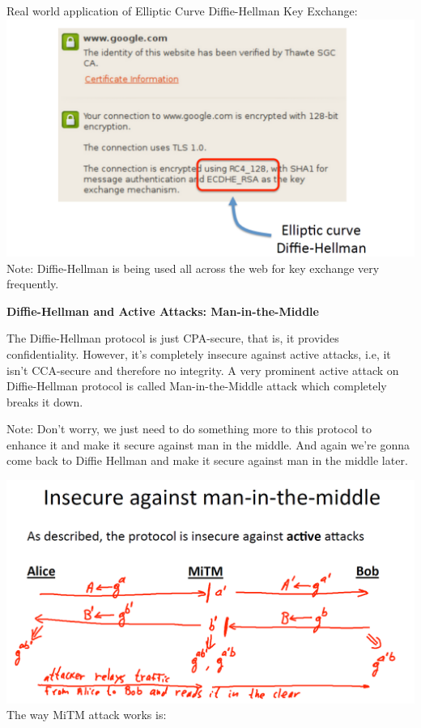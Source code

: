 \documentclass[11pt]{article}
\makeatletter
\def\maxwidth{\ifdim\Gin@nat@width>\linewidth\linewidth
    \else\Gin@nat@width\fi}
\let\Oldincludegraphics\includegraphics
\renewcommand{\includegraphics}[1]{\Oldincludegraphics[width=.8\maxwidth]{#1}}
\makeatother
\begin{document}
Real world application of Elliptic Curve Diffie-Hellman Key Exchange:
\includegraphics{./Images/DH-Application.png} Note: Diffie-Hellman is
being used all across the web for key exchange very frequently.

\textbf{Diffie-Hellman and Active Attacks: Man-in-the-Middle}

The Diffie-Hellman protocol is just CPA-secure, that is, it provides
confidentiality. However, it's completely insecure against active
attacks, i.e, it isn't CCA-secure and therefore no integrity. A very
prominent active attack on Diffie-Hellman protocol is called
Man-in-the-Middle attack which completely breaks it down.

Note: Don't worry, we just need to do something more to this protocol to
enhance it and make it secure against man in the middle. And again we're
gonna come back to Diffie Hellman and make it secure against man in the
middle later.

\includegraphics{./Images/DH-MiTM.png} The way MiTM attack works is:
\end{document}
